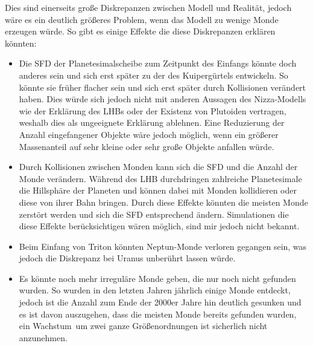 \documentclass[12pt,a4paper,twoside]{article}
\begin{document}
Dies sind einerseits große Diskrepanzen zwischen Modell und Realität, jedoch wäre es ein deutlich größeres Problem, wenn das Modell zu wenige Monde erzeugen würde. So gibt es einige Effekte die diese Diskrepanzen erklären könnten:
\begin{itemize}
\item Die SFD der Planetesimalscheibe zum Zeitpunkt des Einfangs könnte doch anderes sein und sich erst später zu der des Kuipergürtels entwickeln.
So könnte sie früher flacher sein und sich erst später durch Kollisionen verändert haben. Dies würde sich jedoch nicht mit anderen Aussagen des Nizza-Modells wie der Erklärung des LHBs oder der Existenz von Plutoiden vertragen, %
weshalb \cite{Nesvorny2007} dies als ungeeignete Erklärung ablehnen.
Eine Reduzierung der Anzahl eingefangener Objekte wäre jedoch möglich, wenn ein größerer Massenanteil auf sehr kleine oder sehr große Objekte anfallen würde\cite{Nesvorny2007}. %
\item Durch Kollisionen zwischen Monden kann sich die SFD und die Anzahl der Monde verändern. Während des LHB durchdringen zahlreiche Planetesimale die Hillsphäre der Planeten und können dabei mit Monden kollidieren oder diese von ihrer Bahn bringen\cite{Nesvorny2007}. Durch diese Effekte könnten die meisten Monde zerstört werden und sich die SFD entsprechend ändern. Simulationen die diese Effekte berücksichtigen wären möglich, sind mir jedoch nicht bekannt. %
\item Beim Einfang von Triton könnten Neptun-Monde verloren gegangen sein, was jedoch die Diskrepanz bei Uranus unberührt lassen würde\cite{Nesvorny2007}. %
\item Es könnte noch mehr irreguläre Monde geben, die nur noch nicht gefunden wurden. So wurden in den letzten Jahren jährlich einige Monde entdeckt, jedoch ist die Anzahl zum Ende der 2000er Jahre hin deutlich gesunken und es ist davon auszugehen, dass die meisten Monde bereits gefunden wurden, ein \glqq Wachstum\grqq\ um zwei ganze Größenordnungen ist sicherlich nicht anzunehmen.
\end{itemize}
\end{document}
